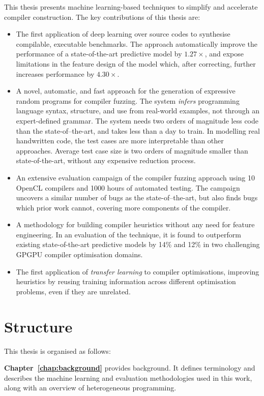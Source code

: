 This thesis presents machine learning-based techniques to simplify and accelerate compiler construction. The key contributions of this thesis are:

\begin{itemize}
  \item The first application of deep learning over source codes to synthesise compilable, executable benchmarks. The approach automatically improve the performance of a state-of-the-art predictive model by $1.27\times$, and expose limitations in the feature design of the model which, after correcting, further increases performance by $4.30\times$.
  \item A novel, automatic, and fast approach for the generation of expressive random programs for compiler fuzzing. The system \emph{infers} programming language syntax, structure, and use from real-world examples, not through an expert-defined grammar. The system needs two orders of magnitude less code than the state-of–the-art, and takes less than a day to train. In modelling real handwritten code, the test cases are more interpretable than other approaches. Average test case size is two orders of magnitude smaller than state-of-the-art, without any expensive reduction process.
  \item An extensive evaluation campaign of the compiler fuzzing approach using 10 OpenCL compilers and 1000 hours of automated testing. The campaign uncovers a similar number of bugs as the state-of–the-art, but also finds bugs which prior work cannot, covering more components of the compiler.
	\item A methodology for building compiler heuristics without any need for feature engineering. In an evaluation of the technique, it is found to outperform existing state-of-the-art predictive models by 14\% and 12\% in two challenging GPGPU compiler optimisation domains.
	\item The first application of \emph{transfer learning} to compiler optimisations, improving heuristics by reusing training information across different optimisation problems, even if they are unrelated.
\end{itemize}


\section{Structure}

This thesis is organised as follows:

\textbf{Chapter~\ref{chap:background}} provides background. It defines terminology and describes the machine learning and evaluation methodologies used in this work, along with an overview of heterogeneous programming.


